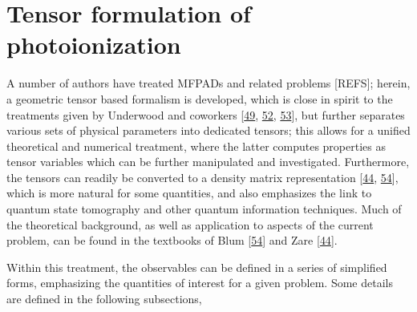 \documentclass[letterpaper,table,10pt,english]{jupyterBook}
\begin{document}
\section{Tensor formulation of photoionization}
\label{\detokenize{part1/theory_tensor_formalism_201122:tensor-formulation-of-photoionization}}\label{\detokenize{part1/theory_tensor_formalism_201122:sec-tensor-formulation}}\label{\detokenize{part1/theory_tensor_formalism_201122::doc}}
\sphinxAtStartPar
A number of authors have treated MFPADs and related problems {[}REFS{]}; herein, a geometric tensor based formalism is developed, which is close in spirit to the treatments given by Underwood and co\sphinxhyphen{}workers {[}\hyperlink{cite.backmatter/bibliography:id812}{49}, \hyperlink{cite.backmatter/bibliography:id754}{52}, \hyperlink{cite.backmatter/bibliography:id842}{53}{]}, but further separates various sets of physical parameters into dedicated tensors; this allows for a unified theoretical and numerical treatment, where the latter computes properties as tensor variables which can be further manipulated and investigated. Furthermore, the tensors can readily be converted to a density matrix representation {[}\hyperlink{cite.backmatter/bibliography:id882}{44}, \hyperlink{cite.backmatter/bibliography:id479}{54}{]}, which is more natural for some quantities, and also emphasizes the link to quantum state tomography and other quantum information techniques. Much of the theoretical background, as well as application to aspects of the current problem, can be found in the textbooks of Blum {[}\hyperlink{cite.backmatter/bibliography:id479}{54}{]}
and Zare {[}\hyperlink{cite.backmatter/bibliography:id882}{44}{]}.

\sphinxAtStartPar
Within this treatment, the observables can be defined in a series of simplified forms, emphasizing the quantities of interest for a given problem. Some details are defined in the following subsections,
\end{document}
